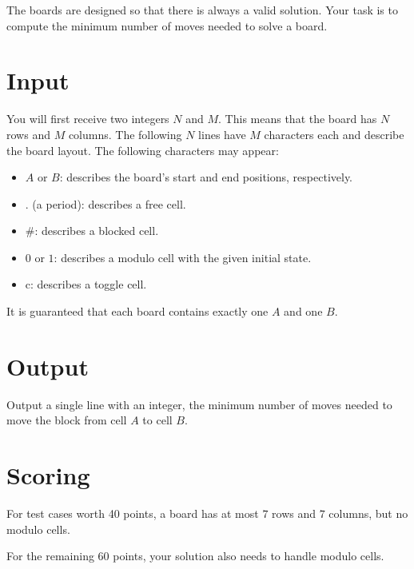 \noindent The boards are designed so that there is always a valid solution. Your task is to compute the minimum number of moves needed to solve a board.

\section*{Input}

You will first receive two integers $N$ and $M$. This means that the board has $N$ rows and $M$ columns.
The following $N$ lines have $M$ characters each and describe the board layout. The following characters may appear:

\begin{itemize}
\item $A$ or $B$: describes the board's start and end positions, respectively.
\item . (a period): describes a free cell.
\item \#: describes a blocked cell.
\item $0$ or $1$: describes a modulo cell with the given initial state.
\item c: describes a toggle cell.
\end{itemize}

It is guaranteed that each board contains exactly one $A$ and one $B$.

\section*{Output}

Output a single line with an integer, the minimum number of moves needed to move the block from cell $A$ to cell $B$.

\section*{Scoring}

For test cases worth 40 points, a board has at most $7$ rows and $7$ columns, but no modulo cells.

\noindent For the remaining 60 points, your solution also needs to handle modulo cells.
